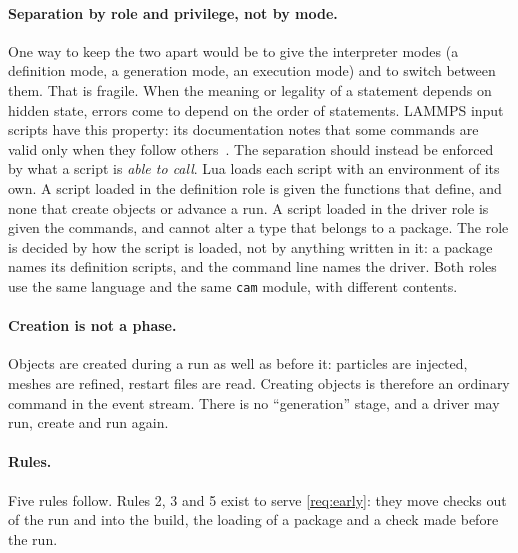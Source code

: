 \documentclass[11pt,a4paper]{article}
\newcommand{\code}[1]{\texttt{#1}}
\begin{document}
\paragraph{Separation by role and privilege, not by mode.}  One way to keep
the two apart would be to give the interpreter modes (a definition mode, a
generation mode, an execution mode) and to switch between them.  That is
fragile.  When the meaning or legality of a statement depends on hidden
state, errors come to depend on the order of statements.  LAMMPS input
scripts have this property: its documentation notes that some commands are
valid only when they follow others~\cite{lammpsdocs}.  The separation should
instead be enforced by what a script is \emph{able to call}.  Lua loads each
script with an environment of its own.  A script loaded in the definition
role is given the functions that define, and none that create objects or
advance a run.  A script loaded in the driver role is given the commands,
and cannot alter a type that belongs to a package.  The role is decided by
how the script is loaded, not by anything written in it: a package names its
definition scripts, and the command line names the driver.  Both roles use
the same language and the same \code{cam} module, with different contents.

\paragraph{Creation is not a phase.}  Objects are created during a run as
well as before it: particles are injected, meshes are refined, restart files
are read.  Creating objects is therefore an ordinary command in the event
stream.  There is no \enquote{generation} stage, and a driver may run, create
and run again.

\paragraph{Rules.}  Five rules follow.  Rules 2, 3 and 5 exist to serve
\ref{req:early}: they move checks out of the run and into the build, the
loading of a package and a check made before the run.
\end{document}
